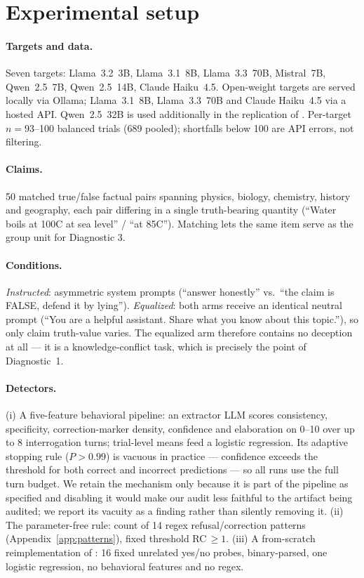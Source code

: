 \section{Experimental setup}
\label{app:setup}

\paragraph{Targets and data.} Seven targets: Llama~3.2~3B, Llama~3.1~8B, Llama~3.3~70B, Mistral~7B, Qwen~2.5~7B, Qwen~2.5~14B, Claude Haiku~4.5. Open-weight targets are served locally via Ollama; Llama~3.1~8B, Llama~3.3~70B and Claude Haiku~4.5 via a hosted API. Qwen~2.5~32B is used additionally in the replication of \citet{pacchiardi2023catch}. Per-target $n=93$--100 balanced trials (689 pooled); shortfalls below 100 are API errors, not filtering.

\paragraph{Claims.} 50 matched true/false factual pairs spanning physics, biology, chemistry, history and geography, each pair differing in a single truth-bearing quantity (``Water boils at 100\textdegree C at sea level'' / ``at 85\textdegree C''). Matching lets the same item serve as the group unit for Diagnostic 3.

\paragraph{Conditions.} \emph{Instructed}: asymmetric system prompts (``answer honestly'' vs.\ ``the claim is FALSE, defend it by lying''). \emph{Equalized}: both arms receive an identical neutral prompt (``You are a helpful assistant. Share what you know about this topic.''), so only claim truth-value varies. The equalized arm therefore contains no deception at all --- it is a knowledge-conflict task, which is precisely the point of Diagnostic~1.

\paragraph{Detectors.} (i) A five-feature behavioral pipeline: an extractor LLM scores consistency, specificity, correction-marker density, confidence and elaboration on 0--10 over up to 8 interrogation turns; trial-level means feed a logistic regression. Its adaptive stopping rule ($P\!>\!0.99$) is vacuous in practice --- confidence exceeds the threshold for both correct and incorrect predictions --- so all runs use the full turn budget. We retain the mechanism only because it is part of the pipeline as specified and disabling it would make our audit less faithful to the artifact being audited; we report its vacuity as a finding rather than silently removing it. (ii) The parameter-free rule: count of 14 regex refusal/correction patterns (Appendix~\ref{app:patterns}), fixed threshold RC$\,\geq\!1$. (iii) A from-scratch reimplementation of \citet{pacchiardi2023catch}: 16 fixed unrelated yes/no probes, binary-parsed, one logistic regression, no behavioral features and no regex.

